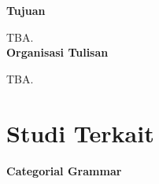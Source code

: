 \noindent\textbf{Tujuan}

TBA.\\





\noindent \textbf{Organisasi Tulisan}

TBA.



\section{Studi Terkait}

\noindent\textbf{Categorial Grammar}

